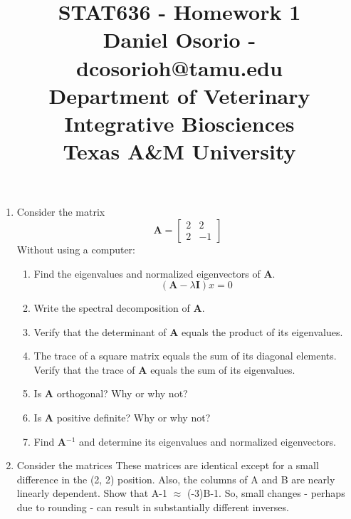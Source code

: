 \documentclass[12pt,a4paper]{paper}
\begin{document}
\title{STAT636 - Homework 1\\\small{Daniel Osorio - dcosorioh@tamu.edu\\Department of Veterinary Integrative Biosciences\\Texas A\&M University}}
\maketitle

\begin{enumerate}
\item Consider the matrix
\[\textbf{A} = \left[\begin{array}{cc}
    2 & 2 \\
    2 & -1
\end{array}\right]\]
Without using a computer:
\begin{enumerate}
\item Find the eigenvalues and normalized eigenvectors of \textbf{A}.
\begin{equation*}
(\textbf{A}-\lambda \textbf{I})x = 0
\end{equation*}
\item Write the spectral decomposition of \textbf{A}.
\item Verify that the determinant of \textbf{A} equals the product of its eigenvalues.
\item The trace of a square matrix equals the sum of its diagonal elements. Verify that the
trace of \textbf{A} equals the sum of its eigenvalues.
\item Is \textbf{A} orthogonal? Why or why not?
\item Is \textbf{A} positive definite? Why or why not?
\item Find \textbf{A}$^{-1}$ and determine its eigenvalues and normalized eigenvectors.
\end{enumerate}
\item Consider the matrices
These matrices are identical except for a small difference in the (2, 2) position. Also, the columns of A and B are nearly linearly dependent. Show that A-1 $\approx$ (-3)B-1. So, small changes - perhaps due to rounding - can result in substantially different inverses.
\end{enumerate}
\end{document}
